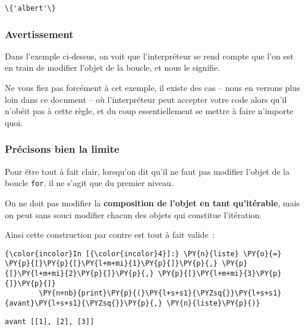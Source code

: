     \begin{Verbatim}[commandchars=\\\{\},frame=single,framerule=0.3mm,rulecolor=\color{cellframecolor}]
\{'albert'\}
\end{Verbatim}

    \hypertarget{avertissement}{%
\subsubsection{Avertissement}\label{avertissement}}

    Dans l'exemple ci-dessus, on voit que l'interpréteur se rend compte que
l'on est en train de modifier l'objet de la boucle, et nous le signifie.

Ne vous fiez pas forcément à cet exemple, il existe des cas -- nous en
verrons plus loin dans ce document -- où l'interpréteur peut accepter
votre code alors qu'il n'obéit pas à cette règle, et du coup
essentiellement se mettre à faire n'importe quoi.

    \hypertarget{pruxe9cisons-bien-la-limite}{%
\subsubsection{Précisons bien la
limite}\label{pruxe9cisons-bien-la-limite}}

    Pour être tout à fait clair, lorsqu'on dit qu'il ne faut pas modifier
l'objet de la boucle \texttt{for}, il ne s'agit que du premier niveau.

On ne doit pas modifier la \textbf{composition de l'objet en tant
qu'itérable}, mais on peut sans souci modifier chacun des objets qui
constitue l'itération.

Ainsi cette construction par contre est tout à fait valide~:

    \begin{Verbatim}[commandchars=\\\{\},frame=single,framerule=0.3mm,rulecolor=\color{cellframecolor}]
{\color{incolor}In [{\color{incolor}4}]:} \PY{n}{liste} \PY{o}{=} \PY{p}{[}\PY{p}{[}\PY{l+m+mi}{1}\PY{p}{]}\PY{p}{,} \PY{p}{[}\PY{l+m+mi}{2}\PY{p}{]}\PY{p}{,} \PY{p}{[}\PY{l+m+mi}{3}\PY{p}{]}\PY{p}{]}
        \PY{n+nb}{print}\PY{p}{(}\PY{l+s+s1}{\PYZsq{}}\PY{l+s+s1}{avant}\PY{l+s+s1}{\PYZsq{}}\PY{p}{,} \PY{n}{liste}\PY{p}{)}
\end{Verbatim}


    \begin{Verbatim}[commandchars=\\\{\},frame=single,framerule=0.3mm,rulecolor=\color{cellframecolor}]
avant [[1], [2], [3]]
\end{Verbatim}

